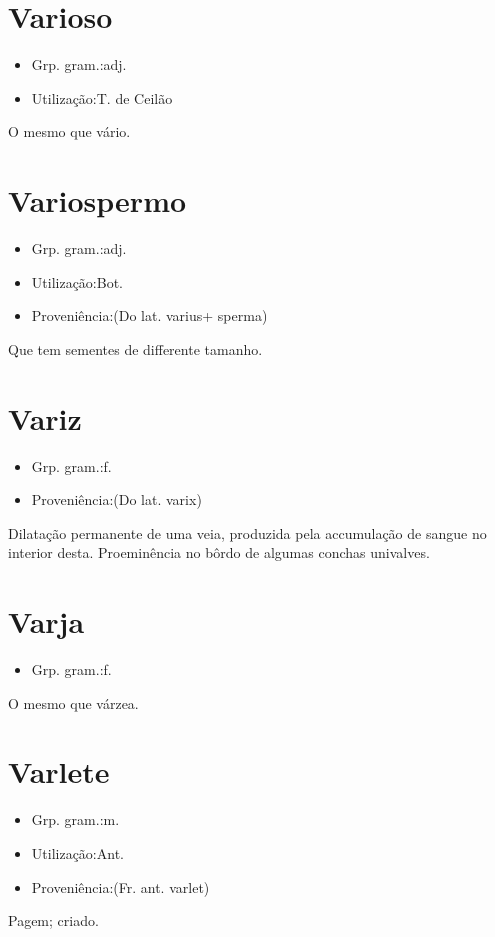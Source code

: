 \documentclass{article}
\begin{document}
\section{Varioso}
\begin{itemize}
\item {Grp. gram.:adj.}
\end{itemize}
\begin{itemize}
\item {Utilização:T. de Ceilão}
\end{itemize}
O mesmo que \textunderscore vário\textunderscore .
\section{Variospermo}
\begin{itemize}
\item {Grp. gram.:adj.}
\end{itemize}
\begin{itemize}
\item {Utilização:Bot.}
\end{itemize}
\begin{itemize}
\item {Proveniência:(Do lat. \textunderscore varius\textunderscore  + \textunderscore sperma\textunderscore )}
\end{itemize}
Que tem sementes de differente tamanho.
\section{Variz}
\begin{itemize}
\item {Grp. gram.:f.}
\end{itemize}
\begin{itemize}
\item {Proveniência:(Do lat. \textunderscore varix\textunderscore )}
\end{itemize}
Dilatação permanente de uma veia, produzida pela accumulação de sangue no interior desta.
Proeminência no bôrdo de algumas conchas univalves.
\section{Varja}
\begin{itemize}
\item {Grp. gram.:f.}
\end{itemize}
O mesmo que \textunderscore várzea\textunderscore .
\section{Varlete}
\begin{itemize}
\item {Grp. gram.:m.}
\end{itemize}
\begin{itemize}
\item {Utilização:Ant.}
\end{itemize}
\begin{itemize}
\item {Proveniência:(Fr. ant. \textunderscore varlet\textunderscore )}
\end{itemize}
Pagem; criado.
\end{document}
